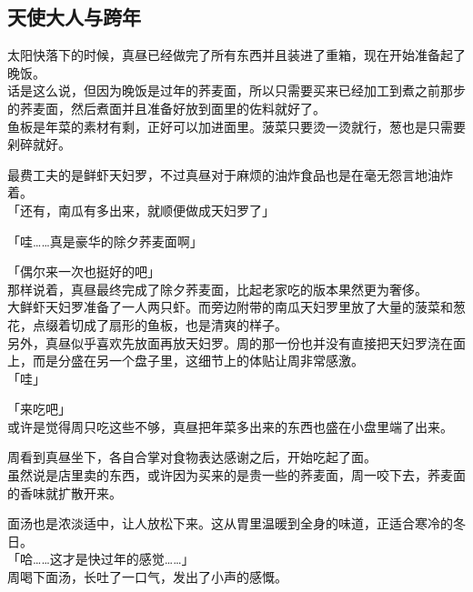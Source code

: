 \subsection{天使大人与跨年}

太阳快落下的时候，真昼已经做完了所有东西并且装进了重箱，现在开始准备起了晚饭。\\

话是这么说，但因为晚饭是过年的荞麦面，所以只需要买来已经加工到煮之前那步的荞麦面，然后煮面并且准备好放到面里的佐料就好了。\\

鱼板是年菜的素材有剩，正好可以加进面里。菠菜只要烫一烫就行，葱也是只需要剁碎就好。

最费工夫的是鲜虾天妇罗，不过真昼对于麻烦的油炸食品也是在毫无怨言地油炸着。\\

「还有，南瓜有多出来，就顺便做成天妇罗了」

「哇……真是豪华的除夕荞麦面啊」

「偶尔来一次也挺好的吧」\\

那样说着，真昼最终完成了除夕荞麦面，比起老家吃的版本果然更为奢侈。\\

大鲜虾天妇罗准备了一人两只虾。而旁边附带的南瓜天妇罗里放了大量的菠菜和葱花，点缀着切成了扇形的鱼板，也是清爽的样子。\\

另外，真昼似乎喜欢先放面再放天妇罗。周的那一份也并没有直接把天妇罗浇在面上，而是分盛在另一个盘子里，这细节上的体贴让周非常感激。\\

「哇」

「来吃吧」\\

或许是觉得周只吃这些不够，真昼把年菜多出来的东西也盛在小盘里端了出来。

周看到真昼坐下，各自合掌对食物表达感谢之后，开始吃起了面。\\

虽然说是店里卖的东西，或许因为买来的是贵一些的荞麦面，周一咬下去，荞麦面的香味就扩散开来。

面汤也是浓淡适中，让人放松下来。这从胃里温暖到全身的味道，正适合寒冷的冬日。\\

「哈……这才是快过年的感觉……」\\

周喝下面汤，长吐了一口气，发出了小声的感慨。\\

